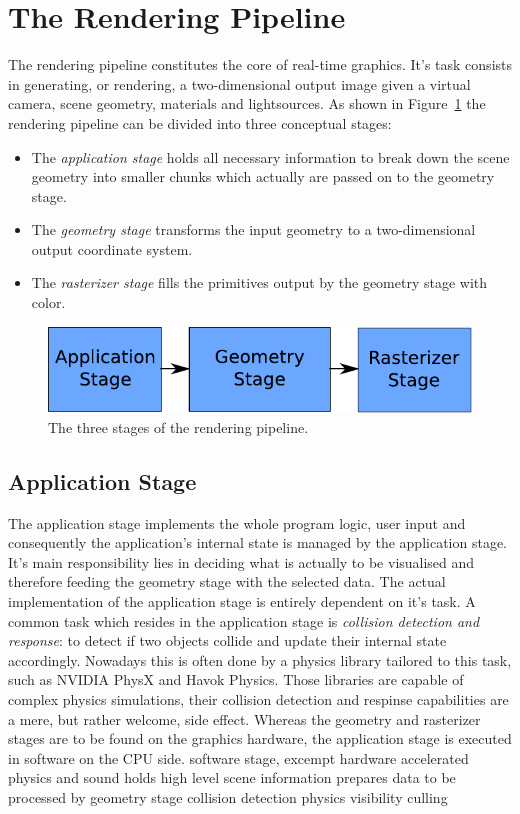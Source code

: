 \section{The Rendering Pipeline}
The rendering pipeline constitutes the core of real-time graphics. It's task
consists in generating, or rendering, a two-dimensional output image given a
virtual camera, scene geometry, materials and
lightsources\cite{book:akenine-rtr}. As shown in Figure~\ref{fig:RAGR} the
rendering pipeline can be divided into three conceptual stages:
\begin{itemize}
 \item The \textit{application stage} holds all necessary information to break
down the scene geometry into smaller chunks which actually are passed on to the
geometry stage.
 \item The \textit{geometry stage} transforms the input geometry to a
two-dimensional output coordinate system.
 \item The \textit{rasterizer stage} fills the primitives output by the
geometry stage with color.
\end{itemize}

\begin{figure}
\begin{center}
\includegraphics[scale=0.8]{Images/Rendering-Pipeline-AGR.pdf}
\caption{The three stages of the rendering pipeline.}
\label{fig:RAGR}
\end{center}
\end{figure}

\subsection{Application Stage}
The application stage implements the whole program logic, user input and
consequently the application's internal state is managed by the application
stage. It's main responsibility lies in deciding what is actually to be
visualised and therefore feeding the geometry stage with the selected data.
The actual implementation of the application stage is entirely dependent on
it's task. 
A common task which resides in the application stage is \textit{collision
detection and response}: to detect if two objects collide and update their
internal state accordingly. Nowadays this is often done by a physics library
tailored to this task, such as NVIDIA PhysX\cite{misc:ageia-physx} and Havok
Physics\cite{misc:havok}. Those libraries are capable of complex physics
simulations, their collision detection and respinse capabilities are a mere,
but rather welcome, side effect.
Whereas the geometry and rasterizer stages are to be found on the graphics
hardware, the application stage is executed in software on the CPU side.
software stage, excempt hardware accelerated physics and sound
holds high level scene information
prepares data to be processed by geometry stage
collision detection
physics
visibility culling

